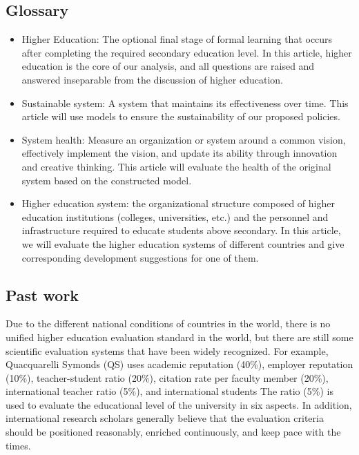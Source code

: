 \documentclass[12pt]{article}  %
\begin{document}
\subsection{Glossary}
\begin{itemize}

\item Higher Education: The optional final stage of formal learning that occurs after completing the required secondary education level. In this article, higher education is the core of our analysis, and all questions are raised and answered inseparable from the discussion of higher education.

\item Sustainable system: A system that maintains its effectiveness over time. This article will use models to ensure the sustainability of our proposed policies.

\item System health: Measure an organization or system around a common vision, effectively implement the vision, and update its ability through innovation and creative thinking. This article will evaluate the health of the original system based on the constructed model.

\item Higher education system: the organizational structure composed of higher education institutions (colleges, universities, etc.) and the personnel and infrastructure required to educate students above secondary. In this article, we will evaluate the higher education systems of different countries and give corresponding development suggestions for one of them.




\end{itemize}



\subsection{Past work}
Due to the different national conditions of countries in the world, there is no unified higher education evaluation standard in the world, but there are still some scientific evaluation systems that have been widely recognized. For example, Quacquarelli Symonds (QS) uses academic reputation (40\%), employer reputation (10\%), teacher-student ratio (20\%), citation rate per faculty member (20\%), international teacher ratio (5\%), and international students The ratio (5\%) is used to evaluate the educational level of the university in six aspects. In addition, international research scholars generally believe that the evaluation criteria should be positioned reasonably, enriched continuously, and keep pace with the times.
\end{document}

